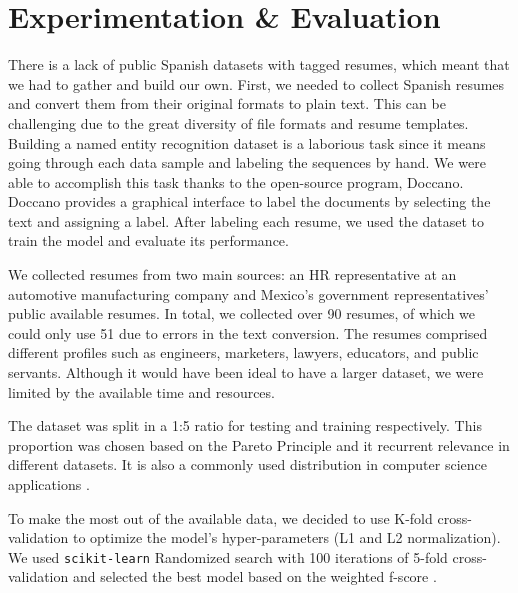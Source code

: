 
  \chapter{Experimentation \& Evaluation} %

\label{Cap5} %

  There is a lack of public Spanish datasets with tagged resumes, which meant
  that we had to gather and build our own. First, we needed to collect
  Spanish resumes and convert them from their original formats to plain text.
  This can be challenging due to the great diversity of file formats and resume
  templates. Building a named entity recognition dataset is a laborious
  task since it means going through each data sample and labeling the sequences
  by hand. We were able to accomplish this task thanks to the open-source
  program, Doccano. Doccano provides a graphical interface to label the
  documents by selecting the text and assigning a label. After labeling each
  resume, we used the dataset to train the model and evaluate its performance.

  We collected resumes from two main sources: an HR representative at an
  automotive manufacturing company and Mexico's government representatives'
  public available resumes. In total, we collected over 90 resumes, of which we
  could only use 51 due to errors in the text conversion. The resumes comprised
  different profiles such as engineers, marketers, lawyers, educators, and
  public servants. Although it would have been ideal to have a larger dataset,
  we were limited by the available time and resources.

  The dataset was split in a 1:5 ratio for testing and training respectively.
  This proportion was chosen based on the Pareto Principle and it recurrent
  relevance in different datasets. It is also a commonly used distribution in
  computer science applications \cite{Harvey2018}.

  To make the most out of the available data, we decided to use K-fold
  cross-validation to optimize the model's hyper-parameters (L1 and L2
  normalization). We used \texttt{scikit-learn} Randomized search with 100
  iterations of
  5-fold cross-validation and selected the best model based on the weighted
  f-score \cite{Pedregosa2011}.

